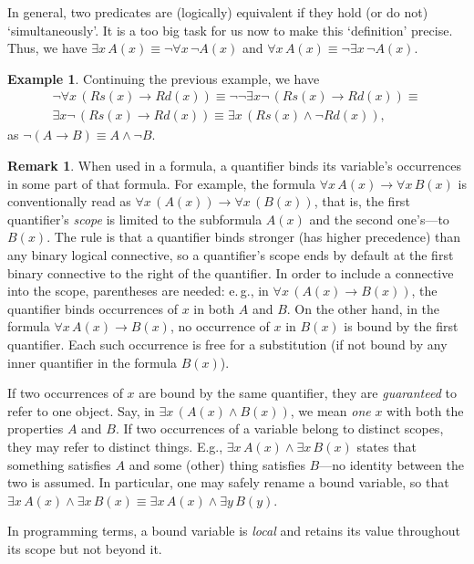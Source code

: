 \documentclass[12pt,notitlepage]{article}
\theoremstyle{plain}
\theoremstyle{definition}
\newtheorem{exm}[thm]{Example}
\newtheorem{rem}[thm]{Remark}
\theoremstyle{plain}
\newcommand{\1}{\mathbf{1}}
\newcommand{\0}{\mathbf{0}}
\begin{document}
In general, two predicates are (logically) equivalent if they hold (or do not) `simultaneously'. It is a too big task for us now to make this `definition' precise. Thus, we have $\exists x\, A(x) \equiv \neg \forall x\, \neg A(x)$ and  $\forall x\, A(x) \equiv \neg \exists x\, \neg A(x)$.

\begin{exm}
Continuing the previous example, we have 
\begin{multline*}
\neg \forall x\, (Rs(x) \to Rd(x)) \equiv \neg \neg \exists x \neg\, (Rs(x) \to Rd(x)) \equiv\\
	 \exists x \neg\, (Rs(x) \to Rd(x)) \equiv\exists x\, (Rs(x) \wedge \neg Rd(x)),
\end{multline*}
as $\neg (A \to B) \equiv A \wedge \neg B$.
\end{exm}

\begin{rem}
When used in a formula, a quantifier binds its variable's occurrences in some part of that formula. For example, the formula $\forall x\, A(x) \to \forall x\, B(x)$ is conventionally read as $\forall x\, ( A(x) ) \to \forall x\, ( B(x) )$, that is, the first quantifier's \emph{scope} is limited to the subformula $A(x)$ and the second one's---to $B(x)$. The rule is that a quantifier binds stronger (has higher precedence) than any binary logical connective, so a quantifier's scope ends by default at the first binary connective to the right of the quantifier. In order to include a connective into the scope, parentheses are needed: e.\,g., in $\forall x\, (A (x) \to B(x))$, the quantifier binds occurrences of $x$ in both $A$ and $B$. On the other hand, in the formula $\forall x\, A(x) \to B(x)$, no occurrence of $x$ in $B(x)$ is bound by the first quantifier. Each such occurrence is free for a substitution (if not bound by any inner quantifier in the formula $B(x)$).

If two occurrences of $x$ are bound by the same quantifier, they are \emph{guaranteed} to refer to one object. Say, in $\exists x\, (A(x) \wedge B(x))$, we mean \emph{one} $x$ with both the properties $A$ and $B$. If two occurrences of a variable belong to distinct scopes, they may refer to distinct things. E.g., $\exists x\, A(x) \wedge \exists x\, B(x)$ states that something satisfies $A$ and some (other) thing satisfies $B$---no identity between the two is assumed. In particular, one may safely rename a bound variable, so that $\exists x\, A(x) \wedge \exists x\, B(x) \equiv \exists x\, A(x) \wedge \exists y\, B(y)$.

In programming terms, a bound variable is \emph{local} and retains its value throughout its scope but not beyond it.
\end{rem}
\end{document}
